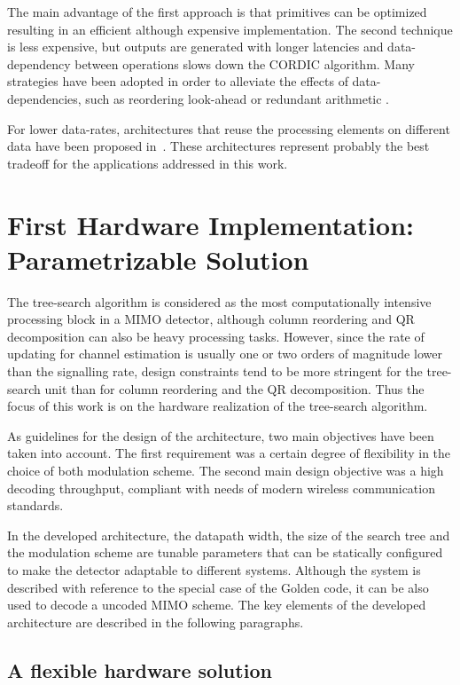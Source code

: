 \documentclass[12pt,onecolumn,draftclsnofoot]{IEEEtran}
\begin{document}
The main advantage of the first approach is that primitives can be
optimized resulting in an efficient although expensive
implementation. The second technique is less expensive, but outputs
are generated with longer latencies and data-dependency between
operations slows down the CORDIC algorithm. Many strategies have
been adopted in order to alleviate the effects of data-dependencies, such as
reordering look-ahead\cite{Annih1, Annih2, ReorgCORDIC1} or
redundant arithmetic \cite{RedundantQR}.

For lower data-rates, architectures that reuse the processing elements
on different data have been proposed in~\cite{Alternat1, Alternat2}.
These architectures represent probably the best
tradeoff for the applications addressed in this work.

\section{First Hardware Implementation: \\
Parametrizable Solution}

\label{HW1}

The tree-search algorithm is considered as the most computationally intensive 
processing block in a MIMO detector, although 
column reordering and QR decomposition can also be heavy processing tasks.
However,  since the rate of updating for channel estimation is usually one
or two orders of magnitude lower than the signalling rate, design constraints
tend to be more stringent for the tree-search unit than for
column reordering and the QR decomposition.
Thus the focus of this work is on the hardware realization of
the tree-search algorithm.

As guidelines for the design of the architecture, two main
objectives have been taken into account. The first requirement was a
certain degree of flexibility in the choice of both modulation
scheme. The second main design
objective was a high decoding throughput, compliant with 
needs of modern wireless communication standards.


In the developed architecture, the datapath width, the size
of the search tree and the modulation scheme are tunable
parameters that can be statically configured to make the detector
adaptable to different systems. Although the system is
described with reference to the special case of the Golden code, it
can be also used to decode a  uncoded MIMO scheme.
The key elements of the developed architecture
are described in the following paragraphs.
\subsection{A flexible hardware solution}
\end{document}
